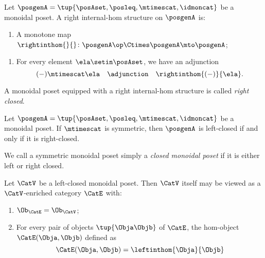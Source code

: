 \begin{ctdefinition}
\label{def:right-internal-hom-monoidal-poset}
Let $\posgenA = \tup{\posAset, \posleq, \mtimescat, \idmoncat}$ be a monoidal poset. A right internal-hom structure on $\posgenA$ is:

\constit
\begin{enumerate}
\item A monotone map $\rightinthom{}{} \colon \posgenA\op \Ctimes \posgenA \mto \posgenA$; 
\end{enumerate}

\condit
\begin{enumerate}
\item For every element $\ela \setin \posAset$, we have an adjunction 
\begin{equation}
( - ) \mtimescat \ela \quad  \adjunction \quad \rightinthom{(-)}{\ela} .
\end{equation}
\end{enumerate}
A monoidal poset equipped with a right internal-hom structure is called \emph{right closed}.
\end{ctdefinition}

\begin{lemma}
\label{lem:symmetric-left-right-closed-monoidal-poset-cat}
Let $\posgenA = \tup{\posAset, \posleq, \mtimescat, \idmoncat}$ be a monoidal poset. If $\mtimescat$ is symmetric, then $\posgenA$ is left-closed if and only if it is right-closed.
\end{lemma}

\begin{ctdefinition}
\label{def:moindal-poset-cat-closed}
We call a symmetric monoidal poset simply a \emph{closed monoidal poset} if it is either left or right closed. 
\end{ctdefinition}


\begin{lemma}
\label{lem:monoidal-closed-poset-self-enriched}
Let $\CatV$ be a left-closed monoidal poset. Then $\CatV$ itself may be viewed as a $\CatV$-enriched category $\CatE$ with:
\begin{enumerate}
\item $\Ob_\CatE = \Ob_\CatV$;
\item For every pair of objects $\tup{\Obja \Objb}$ of $\CatE$, the hom-object $\CatE(\Obja, \Objb)$ defined as 
\begin{equation}
\CatE(\Obja, \Objb) = \leftinthom{\Obja}{\Objb}
\end{equation}
\end{enumerate}
\end{lemma}


